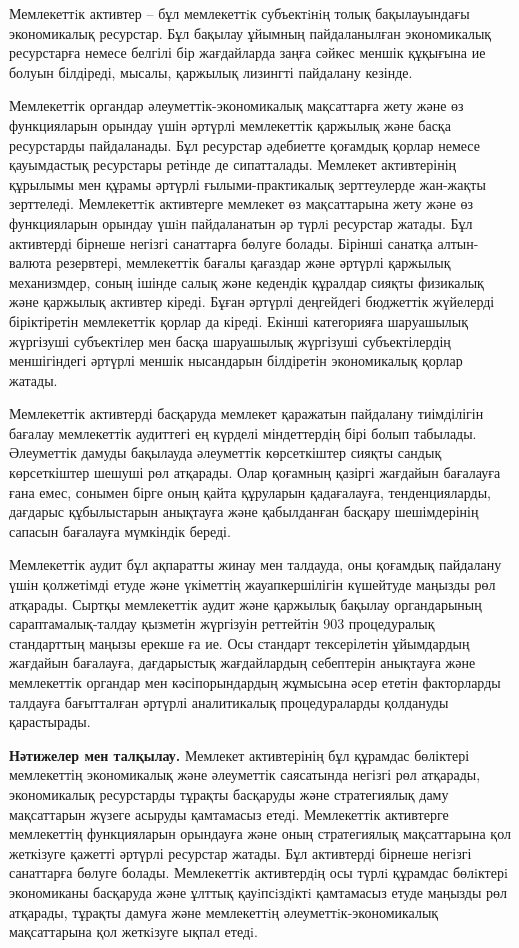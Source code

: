 \begin{multicols}{2}
Мемлекеттiк активтер -- бұл мемлекеттiк субъектiнiң толық бақылауындағы
экономикалық ресурстар. Бұл бақылау ұйымның пайдаланылған экономикалық
ресурстарға немесе белгілі бір жағдайларда заңға сәйкес меншік құқығына
ие болуын білдіреді, мысалы, қаржылық лизингті пайдалану кезінде.

Мемлекеттік органдар әлеуметтік-экономикалық мақсаттарға жету және өз
функцияларын орындау үшін әртүрлі мемлекеттік қаржылық және басқа
ресурстарды пайдаланады. Бұл ресурстар әдебиетте қоғамдық қорлар немесе
қауымдастық ресурстары ретінде де сипатталады. Мемлекет активтерінің
құрылымы мен құрамы әртүрлі ғылыми-практикалық зерттеулерде жан-жақты
зерттеледі. Мемлекеттiк активтерге мемлекет өз мақсаттарына жету және өз
функцияларын орындау үшiн пайдаланатын әр түрлi ресурстар жатады. Бұл
активтерді бірнеше негізгі санаттарға бөлуге болады. Бірінші санатқа
алтын-валюта резервтері, мемлекеттік бағалы қағаздар және әртүрлі
қаржылық механизмдер, соның ішінде салық және кедендік құралдар сияқты
физикалық және қаржылық активтер кіреді. Бұған әртүрлі деңгейдегі
бюджеттік жүйелерді біріктіретін мемлекеттік қорлар да кіреді. Екінші
категорияға шаруашылық жүргізуші субъектілер мен басқа шаруашылық
жүргізуші субъектілердің меншігіндегі әртүрлі меншік нысандарын
білдіретін экономикалық қорлар жатады.

Мемлекеттік активтерді басқаруда мемлекет қаражатын пайдалану
тиімділігін бағалау мемлекеттік аудиттегі ең күрделі міндеттердің бірі
болып табылады. Әлеуметтік дамуды бақылауда әлеуметтік көрсеткіштер
сияқты сандық көрсеткіштер шешуші рөл атқарады. Олар қоғамның қазіргі
жағдайын бағалауға ғана емес, сонымен бірге оның қайта құруларын
қадағалауға, тенденцияларды, дағдарыс құбылыстарын анықтауға және
қабылданған басқару шешімдерінің сапасын бағалауға мүмкіндік береді.

Мемлекеттік аудит бұл ақпаратты жинау мен талдауда, оны қоғамдық
пайдалану үшін қолжетімді етуде және үкіметтің жауапкершілігін күшейтуде
маңызды рөл атқарады. Сыртқы мемлекеттік аудит және қаржылық бақылау
органдарының сараптамалық-талдау қызметін жүргізуін реттейтін 903
процедуралық стандарттың маңызы ерекше ға ие. Осы стандарт тексерілетін
ұйымдардың жағдайын бағалауға, дағдарыстық жағдайлардың себептерін
анықтауға және мемлекеттік органдар мен кәсіпорындардың жұмысына әсер
ететін факторларды талдауға бағытталған әртүрлі аналитикалық
процедураларды қолдануды қарастырады.

{\bfseries Нәтижелер мен талқылау.} Мемлекет активтерінің бұл құрамдас
бөліктері мемлекеттің экономикалық және әлеуметтік саясатында негізгі
рөл атқарады, экономикалық ресурстарды тұрақты басқаруды және
стратегиялық даму мақсаттарын жүзеге асыруды қамтамасыз етеді.
Мемлекеттік активтерге мемлекеттің функцияларын орындауға және оның
стратегиялық мақсаттарына қол жеткізуге қажетті әртүрлі ресурстар
жатады. Бұл активтерді бірнеше негізгі санаттарға бөлуге болады.
Мемлекеттiк активтердiң осы түрлi құрамдас бөлiктерi экономиканы
басқаруда және ұлттық қауiпсiздiктi қамтамасыз етуде маңызды рөл
атқарады, тұрақты дамуға және мемлекеттiң әлеуметтiк-экономикалық
мақсаттарына қол жеткiзуге ықпал етедi.


\end{multicols}
